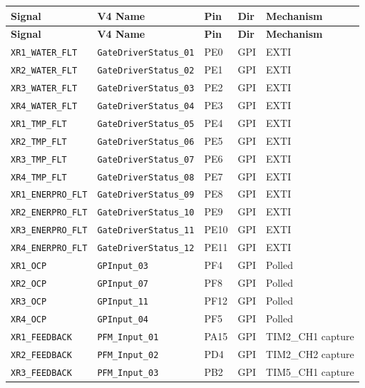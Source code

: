 \documentclass[11pt]{article}
\newcommand{\code}[1]{\texttt{#1}}
\begin{document}
{\small
\begin{longtable}{p{1.3in} p{1.3in} p{0.4in} p{0.45in} p{1.15in}}
  \hline
  \textbf{Signal} & \textbf{V4 Name} & \textbf{Pin} & \textbf{Dir} & \textbf{Mechanism} \\
  \hline
  \endfirsthead
  \hline
  \textbf{Signal} & \textbf{V4 Name} & \textbf{Pin} & \textbf{Dir} & \textbf{Mechanism} \\
  \hline
  \endhead
  \code{XR1\_WATER\_FLT} & \code{GateDriverStatus\_01} & PE0 & GPI & EXTI \\
  \code{XR2\_WATER\_FLT} & \code{GateDriverStatus\_02} & PE1 & GPI & EXTI \\
  \code{XR3\_WATER\_FLT} & \code{GateDriverStatus\_03} & PE2 & GPI & EXTI \\
  \code{XR4\_WATER\_FLT} & \code{GateDriverStatus\_04} & PE3 & GPI & EXTI \\
  \code{XR1\_TMP\_FLT} & \code{GateDriverStatus\_05} & PE4 & GPI & EXTI \\
  \code{XR2\_TMP\_FLT} & \code{GateDriverStatus\_06} & PE5 & GPI & EXTI \\
  \code{XR3\_TMP\_FLT} & \code{GateDriverStatus\_07} & PE6 & GPI & EXTI \\
  \code{XR4\_TMP\_FLT} & \code{GateDriverStatus\_08} & PE7 & GPI & EXTI \\
  \code{XR1\_ENERPRO\_FLT} & \code{GateDriverStatus\_09} & PE8 & GPI & EXTI \\
  \code{XR2\_ENERPRO\_FLT} & \code{GateDriverStatus\_10} & PE9 & GPI & EXTI \\
  \code{XR3\_ENERPRO\_FLT} & \code{GateDriverStatus\_11} & PE10 & GPI & EXTI \\
  \code{XR4\_ENERPRO\_FLT} & \code{GateDriverStatus\_12} & PE11 & GPI & EXTI \\
  \code{XR1\_OCP} & \code{GPInput\_03} & PF4 & GPI & Polled \\
  \code{XR2\_OCP} & \code{GPInput\_07} & PF8 & GPI & Polled \\
  \code{XR3\_OCP} & \code{GPInput\_11} & PF12 & GPI & Polled \\
  \code{XR4\_OCP} & \code{GPInput\_04} & PF5 & GPI & Polled \\
  \code{XR1\_FEEDBACK} & \code{PFM\_Input\_01} & PA15 & GPI & TIM2\_CH1 capture \\
  \code{XR2\_FEEDBACK} & \code{PFM\_Input\_02} & PD4 & GPI & TIM2\_CH2 capture \\
  \code{XR3\_FEEDBACK} & \code{PFM\_Input\_03} & PB2 & GPI & TIM5\_CH1 capture \\

\end{longtable}}
\end{document}
